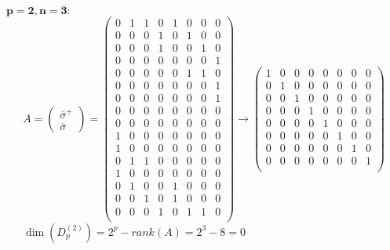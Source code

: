 \noindent$\mathbf{p = 2, n = 3:}$
{\footnotesize
	\[
	A =
	\begin{pmatrix}
		\overline{\sigma}^{+}\\
		\overline{\sigma}
	\end{pmatrix}=
	\begin{pmatrix}
		0 & 1 & 1 & 0 & 1 & 0 & 0 & 0\\
		0 & 0 & 0 & 1 & 0 & 1 & 0 & 0\\
		0 & 0 & 0 & 1 & 0 & 0 & 1 & 0\\
		0 & 0 & 0 & 0 & 0 & 0 & 0 & 1\\
		0 & 0 & 0 & 0 & 0 & 1 & 1 & 0\\
		0 & 0 & 0 & 0 & 0 & 0 & 0 & 1\\
		0 & 0 & 0 & 0 & 0 & 0 & 0 & 1\\
		0 & 0 & 0 & 0 & 0 & 0 & 0 & 0\\
		0 & 0 & 0 & 0 & 0 & 0 & 0 & 0\\
		1 & 0 & 0 & 0 & 0 & 0 & 0 & 0\\
		1 & 0 & 0 & 0 & 0 & 0 & 0 & 0\\
		0 & 1 & 1 & 0 & 0 & 0 & 0 & 0\\
		1 & 0 & 0 & 0 & 0 & 0 & 0 & 0\\
		0 & 1 & 0 & 0 & 1 & 0 & 0 & 0\\
		0 & 0 & 1 & 0 & 1 & 0 & 0 & 0\\
		0 & 0 & 0 & 1 & 0 & 1 & 1 & 0\\
	\end{pmatrix}\rightarrow
	\begin{pmatrix}
		1 & 0 & 0 & 0 & 0 & 0 & 0 & 0\\
		0 & 1 & 0 & 0 & 0 & 0 & 0 & 0\\
		0 & 0 & 1 & 0 & 0 & 0 & 0 & 0\\
		0 & 0 & 0 & 1 & 0 & 0 & 0 & 0\\
		0 & 0 & 0 & 0 & 1 & 0 & 0 & 0\\
		0 & 0 & 0 & 0 & 0 & 1 & 0 & 0\\
		0 & 0 & 0 & 0 & 0 & 0 & 1 & 0\\
		0 & 0 & 0 & 0 & 0 & 0 & 0 & 1\\
	\end{pmatrix}
	\]
}
\noindent\quad\quad~~~$\dim(D^{(2)}_p) = 2^{p} - rank(A) = 2^{3} - 8 = 0$\\

